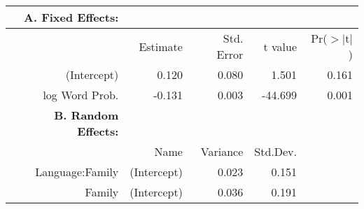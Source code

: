 \begin{tabular}{rrrrr}
 {\bf A. Fixed Effects:} \\
\hline
 & Estimate & Std. Error & t value & Pr($>$$|$t$|$) \\ 
  \hline
(Intercept) & 0.120 & 0.080 & 1.501 & 0.161 \\ 
  log Word Prob. & -0.131 & 0.003 & -44.699 & 0.001 \\ 

\hline \hline
{\bf B. Random Effects:} \\
\hline
& Name & Variance & Std.Dev. \\
\hline
Language:Family & (Intercept) & 0.023 & 0.151 \\
Family & (Intercept) & 0.036 & 0.191 \\
\end{tabular}
